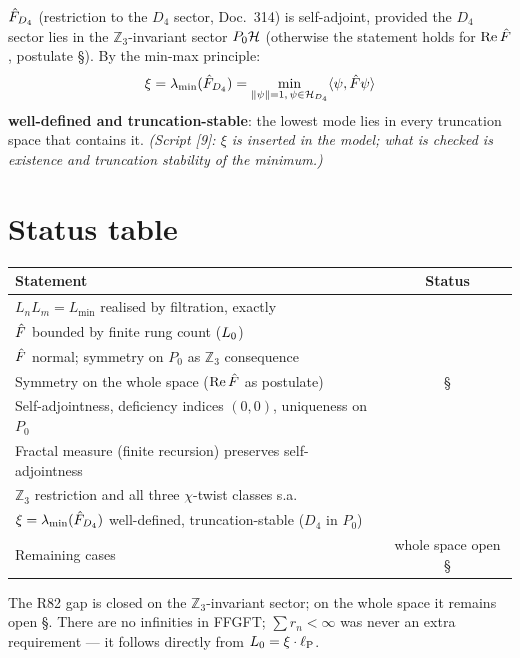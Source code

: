 \begin{tcolorbox}[proofbox, title={Corollary 7 — $\xi$ as well-defined minimum \B}]
  $\hat{F}_{D_4}$ (restriction to the $D_4$ sector, Doc.~314) is self-adjoint,
  provided the $D_4$ sector lies in the $\mathbb{Z}_3$-invariant sector $P_0\mathcal{H}$
  (otherwise the statement holds for $\mathrm{Re}\,\hat{F}$, postulate \S).
  By the min-max principle:
  \[
    \xi = \lambda_{\min}(\hat{F}_{D_4})
        = \min_{\|\psi\|=1,\,\psi\in\mathcal{H}_{D_4}} \langle\psi, \hat{F}\psi\rangle
  \]
  \textbf{well-defined and truncation-stable}: the lowest mode lies in
  every truncation space that contains it.
  \emph{(Script [9]: $\xi$ is inserted in the model; what is checked is existence and truncation stability of the minimum.)}
\end{tcolorbox}

\section{Status table}

\begin{center}
\begin{tabular}{@{}lc@{}}
  \toprule
  \textbf{Statement} & \textbf{Status} \\
  \midrule
  $L_nL_m = L_{\min}$ realised by filtration, exactly & \B \\
  $\hat{F}$ bounded by finite rung count ($L_0$) & \B \\
  $\hat{F}$ normal; symmetry on $P_0$ as $\mathbb{Z}_3$ consequence & \B \\
  Symmetry on the whole space ($\mathrm{Re}\,\hat{F}$ as postulate) & \S \\
  Self-adjointness, deficiency indices $(0,0)$, uniqueness on $P_0$ & \B \\
  Fractal measure (finite recursion) preserves self-adjointness & \B \\
  $\mathbb{Z}_3$ restriction and all three $\chi$-twist classes s.a. & \B \\
  $\xi = \lambda_{\min}(\hat{F}_{D_4})$ well-defined, truncation-stable ($D_4$ in $P_0$) & \B \\
  \midrule
  Remaining cases & whole space open \S \\
  \bottomrule
\end{tabular}
\end{center}

The R82 gap is closed on the $\mathbb{Z}_3$-invariant sector;
on the whole space it remains open \S.
There are no infinities in FFGFT;
$\sum r_n < \infty$ was never an extra requirement —
it follows directly from $L_0 = \xi\cdot\ell_{\mathrm{P}}$.

